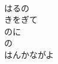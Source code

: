 \documentclass[10pt,b5j]{tarticle} %
\begin{document}
\begin{enumerate}
\begin{minipage}[c]{\blocksize}
        \vspace{\linespace}
        \item~\\
        はるの\\
        きをぎて\\
        のに\\
        の\\
        はんかながよ
    
    \end{minipage}
\end{enumerate} %
\end{document}
